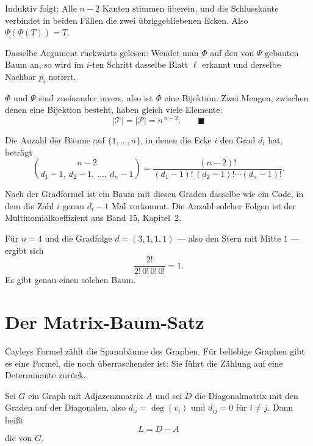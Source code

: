 \begin{merksatz}
Induktiv folgt: Alle $n-2$ Kanten stimmen überein, und die Schlusskante verbindet in beiden Fällen die zwei übriggebliebenen Ecken. Also $\Psi(\Phi(T)) = T$.

Dasselbe Argument rückwärts gelesen: Wendet man $\Phi$ auf den von $\Psi$ gebauten Baum an, so wird im $i$-ten Schritt dasselbe Blatt $\ell$ erkannt und derselbe Nachbar $p_i$ notiert.

$\Phi$ und $\Psi$ sind zueinander invers, also ist $\Phi$ eine Bijektion. Zwei Mengen, zwischen denen eine Bijektion besteht, haben gleich viele Elemente:
\[ |\mathcal{T}| = |\mathcal{P}| = n^{\,n-2} . \qquad \blacksquare \]
\end{merksatz}

\begin{merksatz}
Die Anzahl der Bäume auf $\{1,\ldots,n\}$, in denen die Ecke $i$ den Grad $d_i$ hat, beträgt
\[ \binom{n-2}{d_1 - 1,\ d_2 - 1,\ \ldots,\ d_n - 1} = \frac{(n-2)!}{(d_1-1)!\,(d_2-1)!\cdots(d_n-1)!} . \]

Nach der Gradformel ist ein Baum mit diesen Graden dasselbe wie ein Code, in dem die Zahl $i$ genau $d_i - 1$ Mal vorkommt. Die Anzahl solcher Folgen ist der Multinomialkoeffizient aus Band 15, Kapitel~2.

Für $n=4$ und die Gradfolge $d = (3,1,1,1)$ --- also den Stern mit Mitte $1$ --- ergibt sich
\[ \frac{2!}{2!\,0!\,0!\,0!} = 1 . \]
Es gibt genau einen solchen Baum. \checkmark
\end{merksatz}

\section{Der Matrix-Baum-Satz}

Cayleys Formel zählt die Spannbäume des  Graphen. Für beliebige Graphen gibt es eine Formel, die noch überraschender ist: Sie führt die Zählung auf eine Determinante zurück.

\begin{definition}
Sei $G$ ein Graph mit Adjazenzmatrix $A$ und sei $D$ die Diagonalmatrix mit den Graden auf der Diagonalen, also $d_{ii} = \deg(v_i)$ und $d_{ij} = 0$ für $i \neq j$. Dann heißt
\[ L = D - A \]
die  von $G$.
\end{definition}

